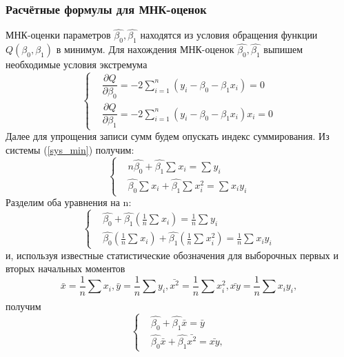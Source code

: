\subsubsection{Расчётные формулы для МНК-оценок}
\noindent МНК-оценки параметров $\hat{\beta_0}, \hat{\beta_1}$ находятся из условия обращения функции $Q(\beta_0, \beta_1)$ в минимум. 
\newline
Для нахождения МНК-оценок $\hat{\beta_0}, \hat{\beta_1}$ выпишем необходимые условия экстремума
\begin{equation}
	\begin{cases}
		& \dfrac{\partial Q}{\partial \beta_{0}}  = 
		-2\sum_{i=1}^{n}{(y_{i} - \beta_{0} - \beta_{1}x_{i})} = 0\\ 
		& \dfrac{\partial Q}{\partial \beta_{1}}  = 
		-2\sum_{i=1}^{n}{(y_{i} - \beta_{0} - \beta_{1}x_{i})x_{i}} = 0 
	\end{cases}
	\label{sys_min}
\end{equation}
Далее для упрощения записи сумм будем опускать индекс суммирования. Из системы (\ref{sys_min}) получим:
\begin{equation}
	\begin{cases}
		& n\hat{\beta_{0}} + \hat{\beta_{1}}\sum_{}{}{x_{i}} = 
		\sum_{}{}{y_{i}}\\ 
		& \hat{\beta_{0}}\sum_{}{}{x_{i}} + \hat{\beta_{1}}\sum_{}{}{x_{i}^{2}} = \sum_{}{}{x_{i}y_{i}}
	\end{cases}
	\label{sys_2}
\end{equation}
Разделим оба уравнения на n:
\begin{equation}
	\begin{cases}
		& \hat{\beta_{0}} + \hat{\beta_{1}}(\frac{1}{n}\sum_{}{}{x_{i}}) = 
		\frac{1}{n}\sum_{}{}{y_{i}}\\ 
		& \hat{\beta_{0}}(\frac{1}{n}\sum_{}{}{x_{i}}) + \hat{\beta_{1}}(\frac{1}{n}\sum_{}{}{x_{i}^{2}}) = \frac{1}{n}\sum_{}{}{x_{i}y_{i}}
	\end{cases}
	\label{sys_3}
\end{equation}
и, используя известные статистические обозначения для выборочных первых и вторых начальных моментов
\begin{equation}
	\bar{x} = \dfrac{1}{n}\sum_{}{}{x_{i}}, \bar{y} = \frac{1}{n}\sum_{}{}{y_{i}}, \bar{x^{2}} = \frac{1}{n}\sum_{}{}{x_{i}^{2}}, \bar{xy} = \frac{1}{n}\sum_{}{}{x_{i}y_{i}}, 
\end{equation}
получим
\begin{equation}
	\begin{cases}
		& \hat{\beta_{0}} + \hat{\beta_{1}}\bar{x} = 
		\bar{y}\\ 
		& \hat{\beta_{0}}\bar{x} + \hat{\beta_{1}}\bar{x^{2}} = \bar{xy},
	\end{cases}
	\label{sys_fin}
\end{equation}
